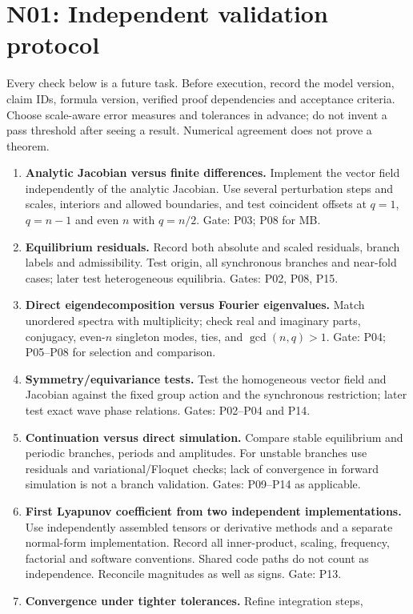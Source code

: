 \section{N01: Independent validation protocol}
Every check below is a future task. Before execution, record the model version,
claim IDs, formula version, verified proof dependencies and acceptance criteria.
Choose scale-aware error measures and tolerances in advance; do not invent a
pass threshold after seeing a result. Numerical agreement does not prove a theorem.
\begin{enumerate}[label=V\arabic*.]
\item \textbf{Analytic Jacobian versus finite differences.} Implement the
vector field independently of the analytic Jacobian. Use several perturbation
steps and scales, interiors and allowed boundaries, and test coincident offsets
at $q=1$, $q=n-1$ and even $n$ with $q=n/2$. Gate: P03; P08 for MB.
\item \textbf{Equilibrium residuals.} Record both absolute and scaled residuals,
branch labels and admissibility. Test origin, all synchronous branches and
near-fold cases; later test heterogeneous equilibria. Gates: P02, P08, P15.
\item \textbf{Direct eigendecomposition versus Fourier eigenvalues.} Match
unordered spectra with multiplicity; check real and imaginary parts,
conjugacy, even-$n$ singleton modes, ties, and $\gcd(n,q)>1$. Gate: P04;
P05--P08 for selection and comparison.
\item \textbf{Symmetry/equivariance tests.} Test the homogeneous vector field
and Jacobian against the fixed group action and the synchronous restriction;
later test exact wave phase relations. Gates: P02--P04 and P14.
\item \textbf{Continuation versus direct simulation.} Compare stable equilibrium
and periodic branches, periods and amplitudes. For unstable branches use
residuals and variational/Floquet checks; lack of convergence in forward
simulation is not a branch validation. Gates: P09--P14 as applicable.
\item \textbf{First Lyapunov coefficient from two independent implementations.}
Use independently assembled tensors or derivative methods and a separate
normal-form implementation. Record all inner-product, scaling, frequency,
factorial and software conventions. Shared code paths do not count as
independence. Reconcile magnitudes as well as signs. Gate: P13.
\item \textbf{Convergence under tighter tolerances.} Refine integration steps,

\end{enumerate}
